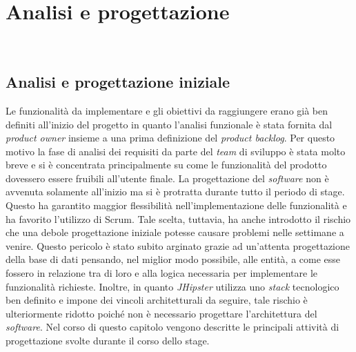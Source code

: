 
\chapter{Analisi e progettazione}
\label{cap:analisi}

\\


\section{Analisi e progettazione iniziale}
Le funzionalità da implementare e gli obiettivi da raggiungere erano già ben definiti all'inizio del progetto in quanto l'analisi funzionale è stata fornita dal \textit{product owner} insieme a una prima definizione del \textit{product backlog}.
Per questo motivo la fase di analisi dei requisiti da parte del \textit{team} di sviluppo è stata molto breve e si è concentrata principalmente su come le funzionalità del prodotto dovessero essere fruibili all'utente finale. La progettazione del \textit{software} non è avvenuta solamente all'inizio ma si è protratta durante tutto il periodo di stage. Questo ha garantito maggior flessibilità nell'implementazione delle funzionalità e ha favorito l'utilizzo di Scrum. Tale scelta, tuttavia, ha anche introdotto il rischio che una debole progettazione iniziale potesse causare problemi nelle settimane a venire. Questo pericolo è stato subito arginato grazie ad un'attenta progettazione della base di dati pensando, nel miglior modo possibile, alle entità, a come esse fossero in relazione tra di loro e alla logica necessaria per implementare le funzionalità richieste. Inoltre, in quanto \textit{JHipster} utilizza uno \textit{stack} tecnologico ben definito e impone dei vincoli architetturali da seguire, tale rischio è ulteriormente ridotto poiché non è necessario progettare l'architettura del \textit{software}.
Nel corso di questo capitolo vengono descritte le principali attività di progettazione svolte durante il corso dello stage.

